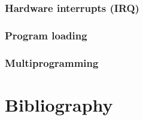 
\begin{frame}
  \frametitle{Hardware interrupts (IRQ)}

\end{frame}


\begin{frame}
  \frametitle{Program loading}

\end{frame}


\begin{frame}
  \frametitle{Multiprogramming}

\end{frame}

%
%

\section{Bibliography}

\begin{thebibliography}{4}


\end{thebibliography}


